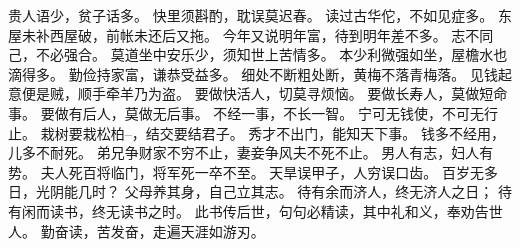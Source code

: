 \documentclass[12pt,UTF8]{ctexbook}
\begin{document}
贵人语少，贫子话多。
快里须斟酌，耽误莫迟春。
读过古华佗，不如见症多。
东屋未补西屋破，前帐未还后又拖。
今年又说明年富，待到明年差不多。
志不同己，不必强合。
莫道坐中安乐少，须知世上苦情多。
本少利微强如坐，屋檐水也滴得多。
勤俭持家富，谦恭受益多。
细处不断粗处断，黄梅不落青梅落。
见钱起意便是贼，顺手牵羊乃为盗。
要做快活人，切莫寻烦恼。
要做长寿人，莫做短命事。
要做有后人，莫做无后事。
不经一事，不长一智。
宁可无钱使，不可无行止。
栽树要栽松柏--，结交要结君子。
秀才不出门，能知天下事。
钱多不经用，儿多不耐死。
弟兄争财家不穷不止，妻妾争风夫不死不止。
男人有志，妇人有势。
夫人死百将临门，将军死一卒不至。
天旱误甲子，人穷误口齿。
百岁无多日，光阴能几时？
父母养其身，自己立其志。
待有余而济人，终无济人之日；
待有闲而读书，终无读书之时。
此书传后世，句句必精读，其中礼和义，奉劝告世人。
勤奋读，苦发奋，走遍天涯如游刃。
\end{document}
